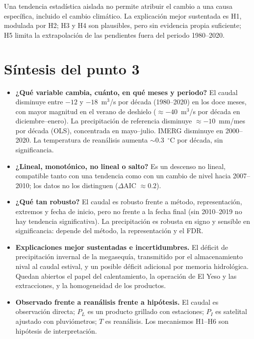 \documentclass[11pt,letterpaper]{article}
\begin{document}
Una tendencia estadística aislada no permite atribuir el cambio a una causa específica, incluido el cambio
climático. La explicación mejor sustentada es H1, modulada por H2; H3 y H4 son plausibles, pero sin evidencia
propia suficiente; H5 limita la extrapolación de las pendientes fuera del periodo 1980--2020.

\section*{Síntesis del punto 3}

\begin{itemize}
\item \textbf{¿Qué variable cambia, cuánto, en qué meses y periodo?} El caudal disminuye entre
$-12$ y $-18$~m$^3$/s por década (1980--2020) en los doce meses, con mayor magnitud en el verano de deshielo
($\approx-40$~m$^3$/s por década en diciembre--enero). La precipitación de referencia disminuye
$\approx-10$~mm/mes por década (OLS), concentrada en mayo--julio. IMERG disminuye en 2000--2020. La temperatura
de reanálisis aumenta $\sim$0.3~$^\circ$C por década, sin significancia.
\item \textbf{¿Lineal, monotónico, no lineal o salto?} Es un descenso no lineal, compatible tanto con una
tendencia como con un cambio de nivel hacia 2007--2010; los datos no los distinguen ($\Delta$AIC $\approx0.2$).
\item \textbf{¿Qué tan robusto?} El caudal es robusto frente a método, representación, extremos y fecha de
inicio, pero no frente a la fecha final (sin 2010--2019 no hay tendencia significativa). La precipitación es
robusta en signo y sensible en significancia: depende del método, la representación y el FDR.
\item \textbf{Explicaciones mejor sustentadas e incertidumbres.} El déficit de precipitación invernal de la
megasequía, transmitido por el almacenamiento nival al caudal estival, y un posible déficit adicional por
memoria hidrológica. Quedan abiertos el papel del calentamiento, la operación de El Yeso y las extracciones, y
la homogeneidad de los productos.
\item \textbf{Observado frente a reanálisis frente a hipótesis.} El caudal es observación directa; $P_L$ es un
producto grillado con estaciones; $P_I$ es satelital ajustado con pluviómetros; $T$ es reanálisis. Los
mecanismos H1--H6 son hipótesis de interpretación.
\end{itemize}
\end{document}
